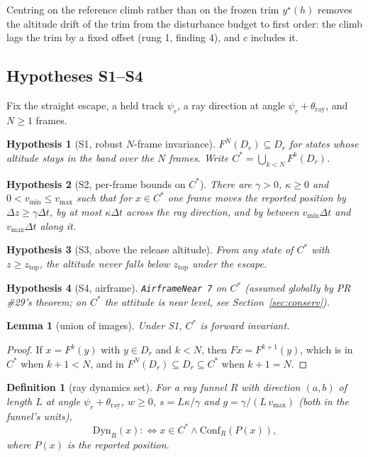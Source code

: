 \documentclass[11pt]{article}
\newtheorem{lemma}[theorem]{Lemma}
\newtheorem{definition}[theorem]{Definition}
\newtheorem{hyp}{Hypothesis}
\newcommand{\Conf}{\ensuremath{\mathrm{Conf}}}
\newcommand{\Dyn}{\ensuremath{\mathrm{Dyn}}}
\newcommand{\zTop}{z_{\mathrm{top}}}
\begin{document}
Centring on the reference climb rather than on the frozen trim $y^\star(h)$ removes the altitude drift of the trim from the disturbance budget to first order: the climb lags the trim by a fixed offset (rung 1, finding 4), and $c$ includes it.

\subsection{Hypotheses S1--S4}

Fix the straight escape, a held track $\psi_r$, a ray direction at angle $\psi_r + \theta_{\mathrm{ray}}$, and $N \ge 1$ frames.

\begin{hyp}[S1, robust $N$-frame invariance]
$F^N(D_r) \subseteq D_r$ for states whose altitude stays in the band over the $N$ frames. Write $C^\ast = \bigcup_{k<N} F^k(D_r)$.
\end{hyp}

\begin{hyp}[S2, per-frame bounds on $C^\ast$]
There are $\gamma > 0$, $\kappa \ge 0$ and $0 < v_{\min} \le v_{\max}$ such that for $x \in C^\ast$ one frame moves the reported position by $\Delta z \ge \gamma\Delta t$, by at most $\kappa\Delta t$ across the ray direction, and by between $v_{\min}\Delta t$ and $v_{\max}\Delta t$ along it.
\end{hyp}

\begin{hyp}[S3, above the release altitude]
From any state of $C^\ast$ with $z \ge \zTop$, the altitude never falls below $\zTop$ under the escape.
\end{hyp}

\begin{hyp}[S4, airframe]
\texttt{AirframeNear 7} on $C^\ast$ (assumed globally by PR \#29's theorem; on $C^\ast$ the attitude is near level, see Section~\ref{sec:conserv}).
\end{hyp}

\begin{lemma}[union of images]\label{lem:union}
Under S1, $C^\ast$ is forward invariant.
\end{lemma}
\begin{proof}
If $x = F^k(y)$ with $y \in D_r$ and $k < N$, then $F x = F^{k+1}(y)$, which is in $C^\ast$ when $k + 1 < N$, and in $F^N(D_r) \subseteq D_r \subseteq C^\ast$ when $k + 1 = N$.
\end{proof}

\begin{definition}[ray dynamics set]
For a ray funnel $R$ with direction $(a, b)$ of length $L$ at angle $\psi_r + \theta_{\mathrm{ray}}$, $w \ge 0$, $s = L\kappa/\gamma$ and $g = \gamma/(L\, v_{\max})$ (both in the funnel's units),
\[ \Dyn_R(x) :\iff x \in C^\ast \wedge \Conf_R(P(x)), \]
where $P(x)$ is the reported position.
\end{definition}
\end{document}

